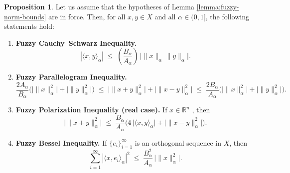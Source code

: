 \documentclass[preprint,12pt]{elsarticle}
\theoremstyle{definition}
\newtheorem{proposition}{Proposition}[section]
\begin{document}
\begin{proposition}\label{prop:fuzzy-inequalities}
Let us assume that the hypotheses of Lemma \ref{lemma:fuzzy-norm-bounds} are in force.
	Then, for all \(x,y\in X\) and all \(\alpha\in(0,1]\), the following statements hold:
	\begin{enumerate}[label=(\roman*)]
		
		\item \textbf{Fuzzy Cauchy--Schwarz Inequality.}
		\[
		|\langle x,y\rangle_{\alpha}|
		\;\leq\;
		\left(\frac{B_{\alpha}}{A_{\alpha}}\right)
		\,\big|\|x\|_{\alpha}\,\|y\|_{\alpha}\big|.
		\]
		
		\item \textbf{Fuzzy Parallelogram Inequality.}
		\[
		\frac{2A_{\alpha}}{B_{\alpha}}
		\big(\big|\|x\|_{\alpha}^{2}\big| + \big|\|y\|_{\alpha}^{2}\big|\big)
		\;\leq\;
		\big|\|x+y\|_{\alpha}^{2}\big| +\big| \|x-y\|_{\alpha}^{2}\big|
		\;\leq\;
		\frac{2B_{\alpha}}{A_{\alpha}}
		\big(\big|\|x\|_{\alpha}^{2}\big| + \big|\|y\|_{\alpha}^{2}\big|\big).
		\]
		
		\item \textbf{Fuzzy Polarization Inequality (real case).}
		If \(x\in \mathbb{R}^n\) , then
		\[
		\big|\|x+y\|_{\alpha}^{2}\big|
		\;\leq\;
		\frac{B_{\alpha}}{A_{\alpha}}\big ( 4\,\big|\langle x,y\rangle_{\alpha}\big|
		+
		\big|\|x-y\|_{\alpha}^{2}\big|\big)
		.
		\]
		
		\item \textbf{Fuzzy Bessel Inequality.}
		If \(\{e_i\}^\infty_{i=1}\) is an orthogonal sequence in \(X\), then
		\[
		\sum_{i=1}^{\infty}
		|\langle x,e_i\rangle_{\alpha}|^{2}
		\;\leq\;
		\frac{B_{\alpha}^{2}}{A_{\alpha}}\,
		\bigg|\|x\|_{\alpha}^{2}\bigg|.
		\]
	\end{enumerate}
\end{proposition}
\end{document}
